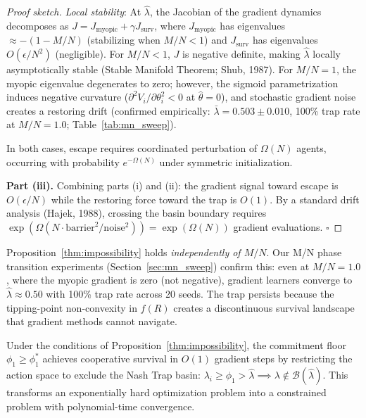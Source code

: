 \begin{proof}[Proof sketch]
\emph{Local stability}: At $\hat{\lambda}$, the Jacobian of the gradient dynamics decomposes as
$J = J_{\mathrm{myopic}} + \gamma J_{\mathrm{surv}}$,
where $J_{\mathrm{myopic}}$ has eigenvalues $\approx -(1-M/N)$ (stabilizing when $M/N < 1$)
and $J_{\mathrm{surv}}$ has eigenvalues $O(\epsilon / N^2)$ (negligible).
For $M/N < 1$, $J$ is negative definite, making $\hat{\lambda}$ locally asymptotically stable
(Stable Manifold Theorem; Shub, 1987).
For $M/N = 1$, the myopic eigenvalue degenerates to zero; however, the sigmoid parametrization induces
negative curvature ($\partial^2 V_i / \partial \theta_i^2 < 0$ at $\hat\theta = 0$),
and stochastic gradient noise creates a restoring drift (confirmed empirically:
$\bar\lambda = 0.503 \pm 0.010$, 100\% trap rate at $M/N{=}1.0$; Table~\ref{tab:mn_sweep}).

In both cases, escape requires coordinated perturbation of $\Omega(N)$ agents,
occurring with probability $e^{-\Omega(N)}$ under symmetric initialization.

\textbf{Part (iii).}
Combining parts (i) and (ii): the gradient signal toward escape is $O(\epsilon/N)$
while the restoring force toward the trap is $O(1)$.
By a standard drift analysis (Hajek, 1988),
crossing the basin boundary requires
$\exp(\Omega(N \cdot \mathrm{barrier}^2 / \mathrm{noise}^2)) = \exp(\Omega(N))$
gradient evaluations. \hfill $\square$
\end{proof}

\begin{remark}[M/N Independence]
\label{rem:mn_independence}
Proposition~\ref{thm:impossibility} holds \emph{independently of $M/N$}.
Our M/N phase transition experiments (Section~\ref{sec:mn_sweep})
confirm this: even at $M/N = 1.0$, where the myopic gradient is zero
(not negative), gradient learners converge to $\hat{\lambda} \approx 0.50$
with 100\% trap rate across 20 seeds.
The trap persists because the tipping-point non-convexity in $f(R)$
creates a discontinuous survival landscape that gradient methods cannot navigate.
\end{remark}

\begin{corollary}
\label{cor:bypass}
Under the conditions of Proposition~\ref{thm:impossibility},
the commitment floor $\phi_1 \geq \phi_1^*$
achieves cooperative survival in $O(1)$ gradient steps by restricting the
action space to exclude the Nash Trap basin:
$\lambda_i \geq \phi_1 > \hat{\lambda} \implies \lambda \notin \mathcal{B}(\hat{\lambda})$.
This transforms an exponentially hard optimization problem
into a constrained problem with polynomial-time convergence.
\end{corollary}


